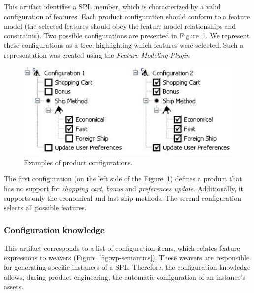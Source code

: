 \documentclass{acm_proc_article-sp}
\begin{document}
This artifact identifies a SPL member, which is characterized by a valid
configuration of features. Each product configuration should conform to a
feature model (the selected features should obey the feature model relationships and constraints). Two possible configurations are presented in
Figure~\ref{fig:product-config-01-02}. We represent these configurations as a
tree, highlighting which features were selected. Such a representation was
created using the \emph{Feature Modeling Plugin}~\cite{czarnecki-eclipse-2004}

 \begin{figure}[h]
 \begin{center}
  \includegraphics[scale=0.40]{img/pc-03.eps}
   \caption{Examples of product configurations.}
  \label{fig:product-config-01-02}
  \end{center}
\end{figure}

  
The first configuration (on the left side of the
Figure~\ref{fig:product-config-01-02}) defines a product that has no support for
\emph{shopping cart}, \emph{bonus} and \emph{preferences update}. Additionally,
it supports only the economical and fast ship methods. The second configuration
selects all possible features. 

\subsubsection{Configuration knowledge}

This artifact corresponds to a list of configuration items, which relates
feature expressions to weavers (Figure~\ref{fig:wp-semantics}). These weavers
are responsible for generating specific instances of a SPL. Therefore, the
configuration knowledge allows, during product engineering, the automatic
configuration of an instance's assets.
\end{document}
